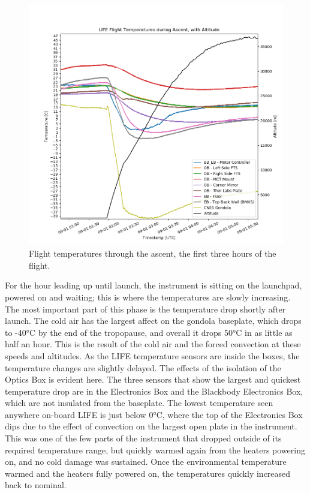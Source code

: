 \begin{figure}
    \centering
    \includegraphics[width=\textwidth]{chap4_images/ascent_images/ascent_no_sim_temps.png}
    \caption{Flight temperatures through the ascent, the first three hours of the flight.}
    \label{fig:ascent_temps_no_sims}
\end{figure}

For the hour leading up until launch, the instrument is sitting on the launchpad, powered on and waiting; this is where the temperatures are slowly increasing. The most important part of this phase is the temperature drop shortly after launch. The cold air has the largest affect on the gondola baseplate, which drops to -40°C by the end of the tropopause, and overall it drops 50°C in as little as half an hour. This is the result of the cold air and the forced convection at these speeds and altitudes. As the LIFE temperature sensors are inside the boxes, the temperature changes are slightly delayed. The effects of the isolation of the Optics Box is evident here. The three sensors that show the largest and quickest temperature drop are in the Electronics Box and the Blackbody Electronics Box, which are not insulated from the baseplate. The lowest temperature seen anywhere on-board LIFE is just below 0°C, where the top of the Electronics Box dips due to the effect of convection on the largest open plate in the instrument. This was one of the few parts of the instrument that dropped outside of its required temperature range, but quickly warmed again from the heaters powering on, and no cold damage was sustained. Once the environmental temperature warmed and the heaters fully powered on, the temperatures quickly increased back to nominal.

